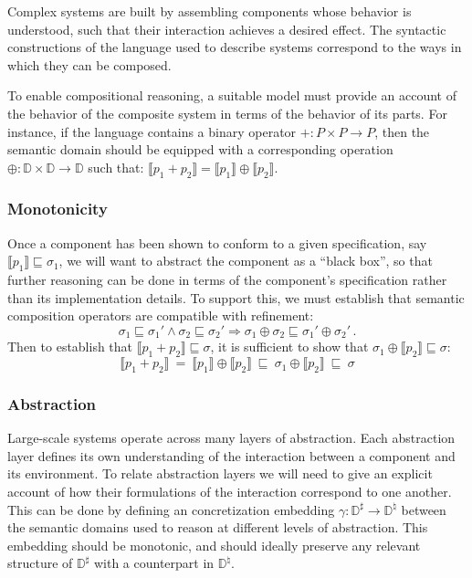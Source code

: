 \documentclass[acmsmall,timestamp,review,anonymous]{acmart}
\begin{document}
Complex systems are built by assembling components
whose behavior is understood,
such that their interaction achieves a desired effect.
The syntactic constructions of
the language used to describe systems
correspond to the ways in which they can be composed.

To enable compositional reasoning,
a suitable model must provide an account of
the behavior of the composite system
in terms of the behavior of its parts.
For instance,
if the language contains a binary operator
${+} : P \times P \rightarrow P$,
then the semantic domain should be equipped with
a corresponding operation
${\oplus} : \mathbb{D} \times \mathbb{D} \rightarrow \mathbb{D}$
such that:
$\llbracket p_1 + p_2 \rrbracket =
 \llbracket p_1 \rrbracket \oplus \llbracket p_2 \rrbracket$.


\subsubsection{Monotonicity} %

Once a component has been shown to conform to a given specification,
say $\llbracket p_1 \rrbracket \sqsubseteq \sigma_1$,
we will want to abstract the component as a ``black box'',
so that further reasoning can be done in terms of
the component's specification rather than its implementation details.
To support this,
we must establish that semantic composition operators
are compatible with refinement:
\[ \sigma_1 \sqsubseteq \sigma_1' \wedge
   \sigma_2 \sqsubseteq \sigma_2' \Rightarrow
   \sigma_1 \oplus \sigma_2 \sqsubseteq \sigma_1' \oplus \sigma_2' \,. \]
Then to establish that
$\llbracket p_1 + p_2 \rrbracket \sqsubseteq \sigma$,
it is sufficient to show that
$\sigma_1 \oplus \llbracket p_2 \rrbracket \sqsubseteq \sigma$:
\[
   \llbracket p_1 + p_2 \rrbracket \: = \:
   \llbracket p_1 \rrbracket \oplus \llbracket p_2 \rrbracket \:\sqsubseteq\:
   \sigma_1 \oplus \llbracket p_2 \rrbracket \:\sqsubseteq\:
   \sigma
\]


\subsubsection{Abstraction} %

Large-scale systems operate across many layers of abstraction.
Each abstraction layer defines its own understanding of the interaction
between a component and its environment.
To relate abstraction layers we will need to give an explicit account
of how their formulations of the interaction correspond to one another.
This can be done by defining an concretization embedding
$\gamma : \mathbb{D}^\sharp \rightarrow \mathbb{D}^\natural$
between the semantic domains
used to reason at different levels of abstraction.
This embedding should be monotonic,
and should ideally preserve any relevant structure of $\mathbb{D}^\sharp$
with a counterpart in $\mathbb{D}^\natural$.
\end{document}
